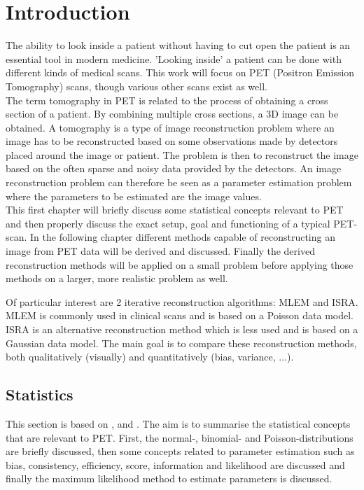 \documentclass[report,12pt]{report}
\begin{document}
\chapter{Introduction}
The ability to look inside a patient without having to cut open the patient is an essential tool in modern medicine. 'Looking inside' a patient can be done with different kinds of medical scans. This work will focus on PET (Positron Emission Tomography) scans, though various other scans exist as well.\\

The term tomography in PET is related to the process of obtaining a cross section of a patient. By combining multiple cross sections, a 3D image can be obtained. A tomography is a type of image reconstruction problem where an image has to be reconstructed based on some observations made by detectors placed around the image or patient. The problem is then to reconstruct the image based  on the often sparse and noisy data provided by the detectors. An image reconstruction problem can therefore be seen as a parameter estimation problem where the parameters to be estimated are the image values.\\

This first chapter will briefly discuss some statistical concepts relevant to PET and then properly discuss the exact setup, goal and functioning of a typical PET-scan. In the following chapter different methods capable of reconstructing  an image from PET data will be derived and discussed. Finally the derived reconstruction methods will be applied on a small problem before applying those methods on a larger, more realistic problem as well.

Of particular interest are 2 iterative reconstruction algorithms: MLEM and ISRA. MLEM is commonly used in clinical scans and is based on a Poisson data model. ISRA is an alternative reconstruction method which is less used and is based on a Gaussian data model. The main goal is to compare these reconstruction methods, both qualitatively (visually) and quantitatively (bias, variance, ...).




\section{Statistics}
This section is based on \cite{stat1}, \cite{stat2} and \cite{stat3}. The aim is to summarise the statistical concepts that are relevant to PET. First, the normal-, binomial- and Poisson-distributions are briefly discussed, then some concepts related to parameter estimation such as bias, consistency, efficiency, score, information and likelihood are discussed and finally the maximum likelihood method to estimate parameters is discussed.
\end{document}
